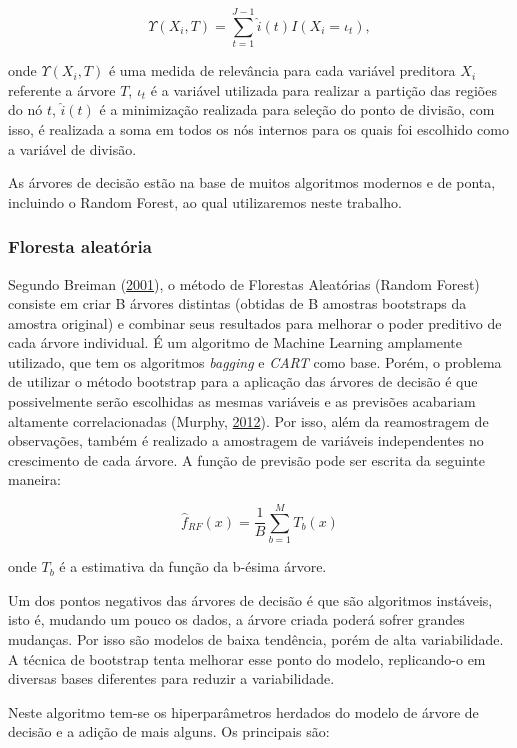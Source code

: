 \documentclass[
	12pt,				%
	a4paper,		%
	oneside,    %
	chapter=TITLE,		   %
	section=TITLE,		   %
	subsection=TITLE,	   %
	subsubsection=TITLE, %
	english,			%
	french,				%
	spanish,			%
	brazil,				%
]{abntex2}
\begin{document}
\[
\Upsilon(X_i, T)= \sum_{t=1}^{J-1} \hat{i}(t) I(X_i=\iota_t),
\]

\noindent onde \(\Upsilon(X_i, T)\) é uma medida de relevância para cada
variável preditora \(X_i\) referente a árvore \(T\), \(\iota_t\) é a
variável utilizada para realizar a partição das regiões do nó \(t\),
\(\hat{i}(t)\) é a minimização realizada para seleção do ponto de
divisão, com isso, é realizada a soma em todos os nós internos para os
quais foi escolhido como a variável de divisão.

As árvores de decisão estão na base de muitos algoritmos modernos e de
ponta, incluindo o Random Forest, ao qual utilizaremos neste trabalho.

\hypertarget{floresta-aleatuxf3ria}{%
\subsubsection{Floresta aleatória}\label{floresta-aleatuxf3ria}}

Segundo Breiman (\protect\hyperlink{ref-breiman2001random}{2001}), o
método de Florestas Aleatórias (Random Forest) consiste em criar B
árvores distintas (obtidas de B amostras bootstraps da amostra original)
e combinar seus resultados para melhorar o poder preditivo de cada
árvore individual. É um algoritmo de Machine Learning amplamente
utilizado, que tem os algoritmos \emph{bagging} e \emph{CART} como base.
Porém, o problema de utilizar o método bootstrap para a aplicação das
árvores de decisão é que possivelmente serão escolhidas as mesmas
variáveis e as previsões acabariam altamente correlacionadas (Murphy,
\protect\hyperlink{ref-murphy2012probabilistic}{2012}). Por isso, além
da reamostragem de observações, também é realizado a amostragem de
variáveis independentes no crescimento de cada árvore. A função de
previsão pode ser escrita da seguinte maneira:

\[
\hat{f}_{RF}(x) = \frac{1}{B}\sum_{b=1}^MT_b(x)
\]

\noindent onde \(T_b\) é a estimativa da função da b-ésima árvore.

Um dos pontos negativos das árvores de decisão é que são algoritmos
instáveis, isto é, mudando um pouco os dados, a árvore criada poderá
sofrer grandes mudanças. Por isso são modelos de baixa tendência, porém
de alta variabilidade. A técnica de bootstrap tenta melhorar esse ponto
do modelo, replicando-o em diversas bases diferentes para reduzir a
variabilidade.

Neste algoritmo tem-se os hiperparâmetros herdados do modelo de árvore
de decisão e a adição de mais alguns. Os principais são:
\end{document}
